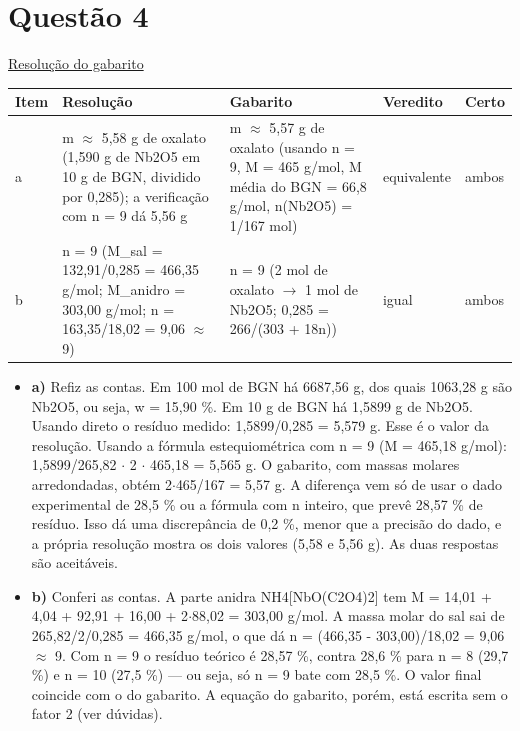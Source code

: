 \documentclass{article}%
\begin{document}
\section*{Questão 4}%
\href{https://poliedroresolve.sistemapoliedro.com.br/vestibulares/ita/2026/ita-2-fase-dia-2-29-10-2025-2-fase-dia-2/dissertativa-4-quimica-2-fase-dia-2-ita-2026}{Resolução do gabarito}\par\smallskip%
\begin{longtable}{@{}p{} p{} p{} p{} p{}@{}}\toprule Item & Resolução & Gabarito & Veredito & Certo \\ \midrule
a & m $\approx$ 5,58 g de oxalato (1,590 g de Nb2O5 em 10 g de BGN, dividido por 0,285); a verificação com n = 9 dá 5,56 g & m $\approx$ 5,57 g de oxalato (usando n = 9, M = 465 g/mol, M média do BGN = 66,8 g/mol, n(Nb2O5) = 1/167 mol) & equivalente & ambos \\
b & n = 9 (M\_sal = 132,91/0,285 = 466,35 g/mol; M\_anidro = 303,00 g/mol; n = 163,35/18,02 = 9,06 $\approx$ 9) & n = 9 (2 mol de oxalato $\to$ 1 mol de Nb2O5; 0,285 = 266/(303 + 18n)) & igual & ambos \\
\bottomrule\end{longtable}%
\begin{itemize}%
\item%
\textbf{a)} Refiz as contas. Em 100 mol de BGN há 6687,56 g, dos quais 1063,28 g são Nb2O5, ou seja, w = 15,90 \%. Em 10 g de BGN há 1,5899 g de Nb2O5. Usando direto o resíduo medido: 1,5899/0,285 = 5,579 g. Esse é o valor da resolução. Usando a fórmula estequiométrica com n = 9 (M = 465,18 g/mol): 1,5899/265,82 $\cdot$ 2 $\cdot$ 465,18 = 5,565 g. O gabarito, com massas molares arredondadas, obtém 2$\cdot$465/167 = 5,57 g. A diferença vem só de usar o dado experimental de 28,5 \% ou a fórmula com n inteiro, que prevê 28,57 \% de resíduo. Isso dá uma discrepância de 0,2 \%, menor que a precisão do dado, e a própria resolução mostra os dois valores (5,58 e 5,56 g). As duas respostas são aceitáveis.%
\item%
\textbf{b)} Conferi as contas. A parte anidra NH4{[}NbO(C2O4)2{]} tem M = 14,01 + 4,04 + 92,91 + 16,00 + 2$\cdot$88,02 = 303,00 g/mol. A massa molar do sal sai de 265,82/2/0,285 = 466,35 g/mol, o que dá n = (466,35 - 303,00)/18,02 = 9,06 $\approx$ 9. Com n = 9 o resíduo teórico é 28,57 \%, contra 28,6 \% para n = 8 (29,7 \%) e n = 10 (27,5 \%) --- ou seja, só n = 9 bate com 28,5 \%. O valor final coincide com o do gabarito. A equação do gabarito, porém, está escrita sem o fator 2 (ver dúvidas).%
\end{itemize}%
\end{document}
